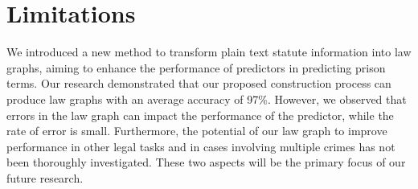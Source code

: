 \section*{Limitations}
We introduced a new method to transform plain text statute information into law graphs, aiming to enhance the performance of predictors in predicting prison terms. Our research demonstrated that our proposed construction process can produce law graphs with an average accuracy of 97\%. However, we observed that errors in the law graph can impact the performance of the predictor, while the rate of error is small.
Furthermore, the potential of our law graph to improve performance in other legal tasks and in cases involving multiple crimes has not been thoroughly investigated. These two aspects will be the primary focus of our future research.



